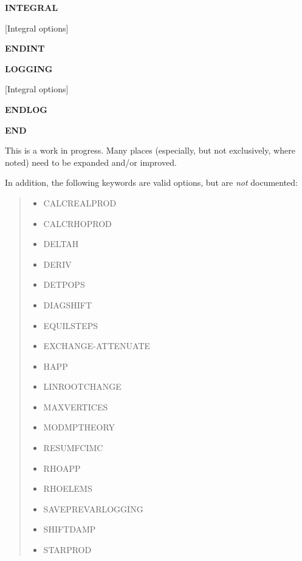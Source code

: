 \documentclass[openany,a4paper,10pt]{manual}
\begin{document}
\textbf{INTEGRAL}

{[}Integral options{]}

\textbf{ENDINT}

\textbf{LOGGING}

{[}Integral options{]}

\textbf{ENDLOG}

\textbf{END}

\begin{notice}[warning]
This is a work in progress.  Many places (especially, but not
exclusively, where noted) need to be expanded and/or improved.

In addition, the following keywords are valid options, but are
\emph{not} documented:
\begin{quote}
\begin{itemize}
\item {} 
CALCREALPROD

\item {} 
CALCRHOPROD

\item {} 
DELTAH

\item {} 
DERIV

\item {} 
DETPOPS

\item {} 
DIAGSHIFT

\item {} 
EQUILSTEPS

\item {} 
EXCHANGE-ATTENUATE

\item {} 
HAPP

\item {} 
LINROOTCHANGE

\item {} 
MAXVERTICES

\item {} 
MODMPTHEORY

\item {} 
RESUMFCIMC

\item {} 
RHOAPP

\item {} 
RHOELEMS

\item {} 
SAVEPREVARLOGGING

\item {} 
SHIFTDAMP

\item {} 
STARPROD


\end{itemize}
\end{quote}
\end{notice}
\end{document}
